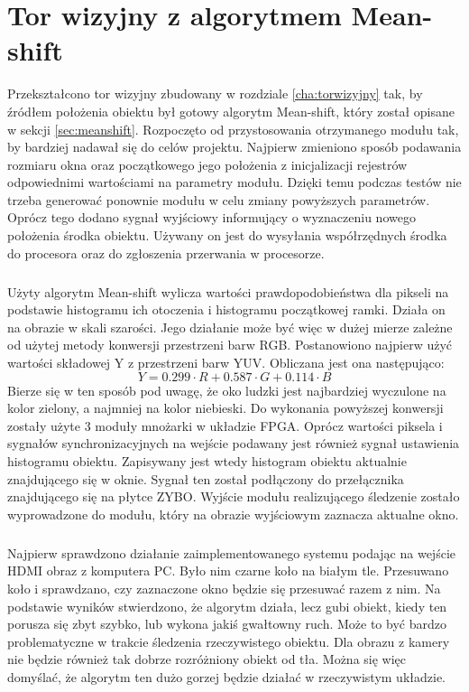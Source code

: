\chapter{Tor wizyjny z algorytmem Mean-shift}
\label{cha:torwizyjnyzalgorytmemmeanshift}

Przekształcono tor wizyjny zbudowany w rozdziale \ref{cha:torwizyjny} tak, by źródłem położenia obiektu był gotowy algorytm Mean-shift, który został opisane w sekcji \ref{sec:meanshift}. Rozpoczęto od przystosowania otrzymanego modułu tak, by bardziej nadawał się do celów projektu. Najpierw zmieniono sposób podawania rozmiaru okna oraz początkowego jego położenia z inicjalizacji rejestrów odpowiednimi wartościami na parametry modułu. Dzięki temu podczas testów nie trzeba generować ponownie modułu w celu zmiany powyższych parametrów. Oprócz tego dodano sygnał wyjściowy informujący o wyznaczeniu nowego położenia środka obiektu. Używany on jest do wysyłania współrzędnych środka do procesora oraz do zgłoszenia przerwania w procesorze.

\paragraph*{}
Użyty algorytm Mean-shift wylicza wartości prawdopodobieństwa dla pikseli na podstawie histogramu ich otoczenia i histogramu początkowej ramki. Działa on na obrazie w skali szarości. Jego działanie może być więc w dużej mierze zależne od użytej metody konwersji przestrzeni barw RGB. Postanowiono najpierw użyć wartości składowej Y z przestrzeni barw YUV. Obliczana jest ona następująco:
\begin{equation}
\label{eq:grayscale}
Y=0.299 \cdot R+0.587 \cdot G+0.114 \cdot B
\end{equation}
Bierze się w ten sposób pod uwagę, że oko ludzki jest najbardziej wyczulone na kolor zielony, a najmniej na kolor niebieski. Do wykonania powyższej konwersji zostały użyte 3 moduły mnożarki w układzie FPGA.
Oprócz wartości piksela i sygnałów synchronizacyjnych na wejście podawany jest również sygnał ustawienia histogramu obiektu. Zapisywany jest wtedy histogram obiektu aktualnie znajdującego się w oknie. Sygnał ten został podłączony do przełącznika znajdującego się na płytce ZYBO. Wyjście modułu realizującego śledzenie zostało wyprowadzone do modułu, który na obrazie wyjściowym zaznacza aktualne okno.

\paragraph*{}
Najpierw sprawdzono działanie zaimplementowanego systemu podając na wejście HDMI obraz z komputera PC. Było nim czarne koło na białym tle. Przesuwano koło i sprawdzano, czy zaznaczone okno będzie się przesuwać razem z nim. Na podstawie wyników stwierdzono, że algorytm działa, lecz gubi obiekt, kiedy ten porusza się zbyt szybko, lub wykona jakiś gwałtowny ruch. Może to być bardzo problematyczne w trakcie śledzenia rzeczywistego obiektu. Dla obrazu z kamery nie będzie również tak dobrze rozróżniony obiekt od tła. Można się więc domyślać, że algorytm ten dużo gorzej będzie działać w rzeczywistym układzie.

